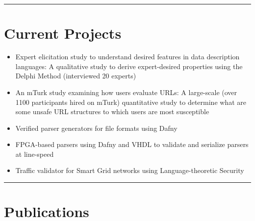 \documentclass[letterpaper,10pt]{article}
\begin{document}
\hrule


\section*{\color{dartmouthgreen} Current Projects}
\begin{itemize}
  \setlength\itemsep{0ex}
  \item Expert elicitation study to understand desired features in data description languages: A qualitative study to derive expert-desired properties using the Delphi Method (interviewed 20 experts)
  \item An mTurk study examining how users evaluate URLs: A large-scale (over 1100 participants hired on mTurk) quantitative study to determine what are some unsafe URL structures to which users are most susceptible
  \item Verified parser generators for file formats using Dafny
  \item FPGA-based parsers using Dafny and VHDL to validate and serialize parsers at line-speed
  \item Traffic validator for Smart Grid networks using Language-theoretic Security
\end{itemize}


\vspace{0.5cm}
\hrule


\section*{\color{dartmouthgreen} Publications}



\end{document}
